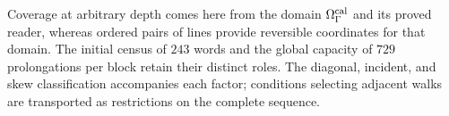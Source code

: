 Coverage at arbitrary depth comes here from the domain
\(\Omega_\Gamma^{\rm cal}\) and its proved reader, whereas ordered
pairs of lines provide reversible coordinates for that domain.
The initial census of \(243\) words and the global capacity of
\(729\) prolongations per block retain their distinct roles.
The diagonal, incident, and skew classification accompanies each factor;
conditions selecting adjacent walks are transported as restrictions on
the complete sequence.
